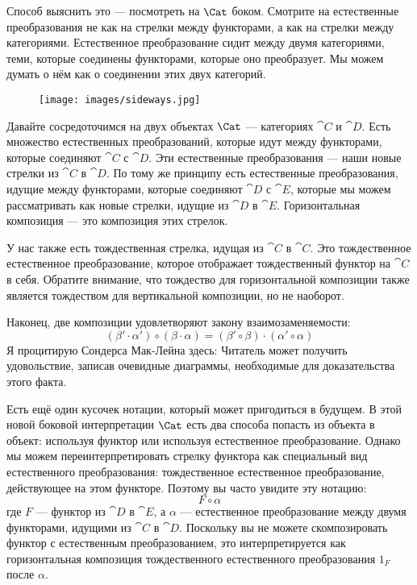 Способ выяснить это --- посмотреть на $\Cat$ боком. Смотрите на
естественные преобразования не как на стрелки между функторами, а как на стрелки
между категориями. Естественное преобразование сидит между двумя
категориями, теми, которые соединены функторами, которые оно преобразует.
Мы можем думать о нём как о соединении этих двух категорий.

\begin{figure}[H]
  \centering
  \texttt{[image: images/sideways.jpg]}
\end{figure}

\noindent
Давайте сосредоточимся на двух объектах $\Cat$ --- категориях $\cat{C}$ и $\cat{D}$. Есть
множество естественных преобразований, которые идут между функторами, которые
соединяют $\cat{C}$ с $\cat{D}$. Эти естественные преобразования --- наши новые стрелки из $\cat{C}$
в $\cat{D}$. По тому же принципу есть естественные преобразования, идущие между
функторами, которые соединяют $\cat{D}$ с $\cat{E}$, которые мы можем рассматривать как новые стрелки, идущие
из $\cat{D}$ в $\cat{E}$. Горизонтальная композиция --- это композиция этих стрелок.

У нас также есть тождественная стрелка, идущая из $\cat{C}$ в $\cat{C}$. Это
тождественное естественное преобразование, которое отображает тождественный функтор на $\cat{C}$ в себя.
Обратите внимание, что тождество для горизонтальной композиции также является тождеством
для вертикальной композиции, но не наоборот.

Наконец, две композиции удовлетворяют закону взаимозаменяемости:
\[(\beta' \cdot \alpha') \circ (\beta \cdot \alpha) = (\beta' \circ \beta) \cdot (\alpha' \circ \alpha)\]
Я процитирую Сондерса Мак-Лейна здесь: Читатель может получить удовольствие, записав
очевидные диаграммы, необходимые для доказательства этого факта.

Есть ещё один кусочек нотации, который может пригодиться в
будущем. В этой новой боковой интерпретации $\Cat$ есть
два способа попасть из объекта в объект: используя функтор или используя
естественное преобразование. Однако мы можем переинтерпретировать стрелку функтора
как специальный вид естественного преобразования: тождественное естественное
преобразование, действующее на этом функторе. Поэтому вы часто увидите эту
нотацию:
\[F \circ \alpha\]
где $F$ --- функтор из $\cat{D}$ в $\cat{E}$, а $\alpha$ --- естественное преобразование
между двумя функторами, идущими из $\cat{C}$ в $\cat{D}$. Поскольку вы не можете скомпозировать
функтор с естественным преобразованием, это интерпретируется как
горизонтальная композиция тождественного естественного преобразования
$1_F$ после $\alpha$.

